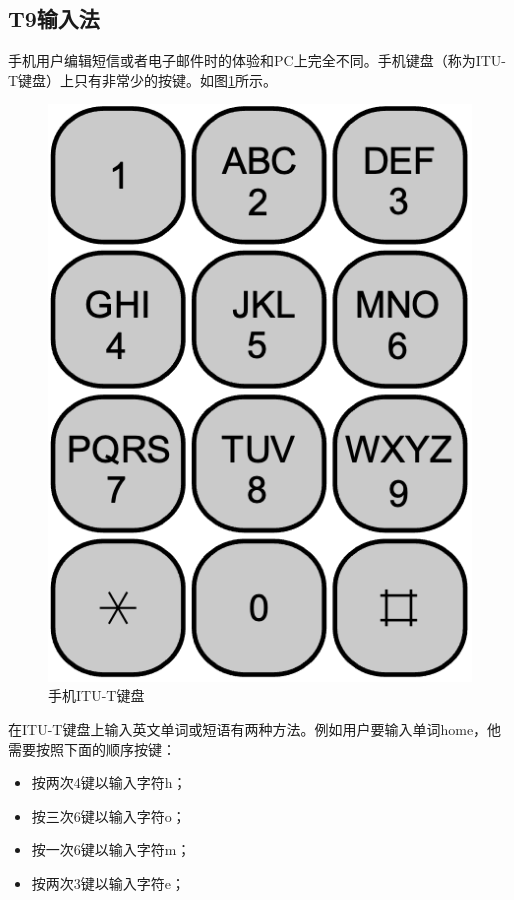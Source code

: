 \documentclass[b5paper]{ctexart}
\begin{document}

\subsection{T9输入法}

手机用户编辑短信或者电子邮件时的体验和PC上完全不同。手机键盘（称为ITU-T键盘）上只有非常少的按键。如图\ref{fig:itut-keypad}所示。

\begin{figure}[htbp]
  \centering
  \includegraphics[scale=0.4]{img/itu-t.png}
  \caption{手机ITU-T键盘}
  \label{fig:itut-keypad}
\end{figure}

在ITU-T键盘上输入英文单词或短语有两种方法。例如用户要输入单词home，他需要按照下面的顺序按键：

\begin{itemize}
\item 按两次4键以输入字符h；
\item 按三次6键以输入字符o；
\item 按一次6键以输入字符m；
\item 按两次3键以输入字符e；
\end{itemize}
\end{document}
